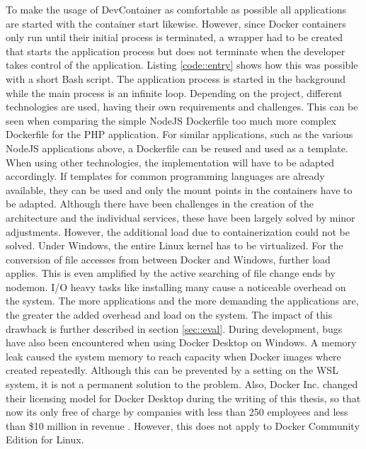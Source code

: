         To make the usage of DevContainer as comfortable as possible all applications are started with the container start likewise. However, since Docker containers only run until their initial process is terminated, a wrapper had to be created that starts the application process but does not terminate when the developer takes control of the application. Listing \ref{code::entry} shows how this was possible with a short Bash script. The application process is started in the background while the main process is an infinite loop. \newline
        Depending on the project, different technologies are used, having their own requirements and challenges. This can be seen when comparing the simple NodeJS Dockerfile too much more complex Dockerfile for the PHP application. For similar applications, such as the various NodeJS applications above, a Dockerfile can be reused and used as a template. When using other technologies, the implementation will have to be adapted accordingly. If templates for common programming languages are already available, they can be used and only the mount points in the containers have to be adapted. \newline
        Although there have been challenges in the creation of the architecture and the individual services, these have been largely solved by minor adjustments. However, the additional load due to containerization could not be solved. Under Windows, the entire Linux kernel has to be virtualized. For the conversion of file accesses from between Docker and Windows, further load applies. This is even amplified by the active searching of file change ends by nodemon. \acs{I/O} heavy tasks like installing many  cause a noticeable overhead on the system. The more applications and the more demanding the applications are, the greater the added overhead and load on the system. The impact of this drawback is further described in section \ref{sec::eval}. \newline
        During development, bugs have also been encountered when using Docker Desktop on Windows. A memory leak caused the system memory to reach capacity when Docker images where created repeatedly. Although this can be prevented by a setting on the \ac{WSL} system, it is not a permanent solution to the problem. Also, Docker Inc. changed their licensing model for Docker Desktop during the writing of this thesis, so that now its only free of charge by companies with less than 250 employees and less than \$10 million in revenue \cite{dockerblog}. However, this does not apply to Docker Community Edition for Linux.

